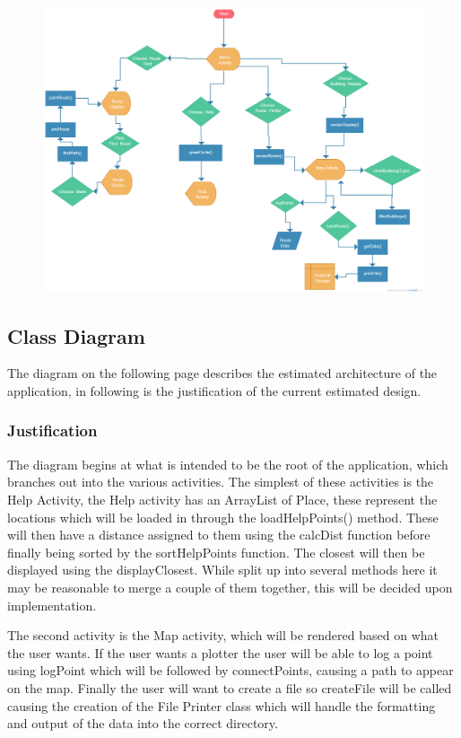 \newpage
{}


\begin{figure}
\includegraphics[scale=0.27]{Design/Flow.png}
\end{figure}


\newpage
\restoregeometry
\subsection{Class Diagram}
The diagram on the following page describes the estimated architecture of the application, in following is the justification of the current estimated design.
\subsubsection{Justification}
The diagram begins at what is intended to be the root of the application, which branches out into the various activities. The simplest of these activities is the Help Activity, the Help activity has an ArrayList of Place, these represent the locations which will be loaded in through the loadHelpPoints() method. These will then have a distance assigned to them using the calcDist function before finally being sorted by the sortHelpPoints function. The closest will then be displayed using the displayClosest. While split up into several methods here it may be reasonable to merge a couple of them together, this will be decided upon implementation. 

The second activity is the Map activity, which will be rendered based on what the user wants. If the user wants a plotter the user will be able to log a point using logPoint which will be followed by connectPoints, causing a path to appear on the map. Finally the user will want to create a file so createFile will be called causing the creation of the File Printer class which will handle the formatting and output of the data into the correct directory. 

